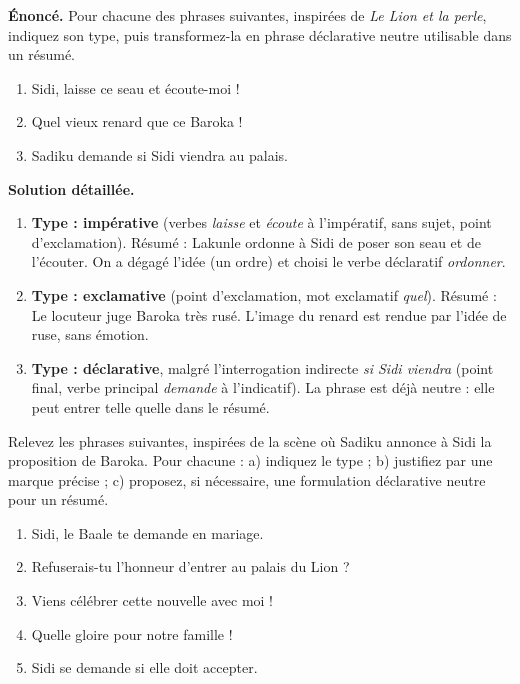 \documentclass[11pt]{article}
\begin{document}
\begin{exoresolu}
\textbf{Énoncé.} Pour chacune des phrases suivantes, inspirées de \emph{Le Lion et la perle}, indiquez son type, puis transformez-la en phrase déclarative neutre utilisable dans un résumé.
\begin{enumerate}
\item \og Sidi, laisse ce seau et écoute-moi ! \fg
\item \og Quel vieux renard que ce Baroka ! \fg
\item \og Sadiku demande si Sidi viendra au palais. \fg
\end{enumerate}
\tcblower
\textbf{Solution détaillée.}
\begin{enumerate}
\item \textbf{Type : impérative} (verbes \emph{laisse} et \emph{écoute} à l'impératif, sans sujet, point d'exclamation). Résumé : \og Lakunle ordonne à Sidi de poser son seau et de l'écouter. \fg{} On a dégagé l'idée (un ordre) et choisi le verbe déclaratif \emph{ordonner}.
\item \textbf{Type : exclamative} (point d'exclamation, mot exclamatif \emph{quel}). Résumé : \og Le locuteur juge Baroka très rusé. \fg{} L'image du renard est rendue par l'idée de ruse, sans émotion.
\item \textbf{Type : déclarative}, malgré l'interrogation indirecte \emph{si Sidi viendra} (point final, verbe principal \emph{demande} à l'indicatif). La phrase est déjà neutre : elle peut entrer telle quelle dans le résumé.
\end{enumerate}
\end{exoresolu}

\begin{exercice}
Relevez les phrases suivantes, inspirées de la scène où Sadiku annonce à Sidi la proposition de Baroka. Pour chacune : a) indiquez le type ; b) justifiez par une marque précise ; c) proposez, si nécessaire, une formulation déclarative neutre pour un résumé.
\begin{enumerate}
\item \og Sidi, le Baale te demande en mariage. \fg
\item \og Refuserais-tu l'honneur d'entrer au palais du Lion ? \fg
\item \og Viens célébrer cette nouvelle avec moi ! \fg
\item \og Quelle gloire pour notre famille ! \fg
\item \og Sidi se demande si elle doit accepter. \fg
\end{enumerate}
\end{exercice}
\end{document}
